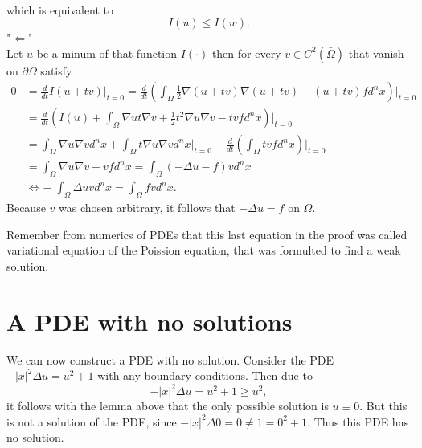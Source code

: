 \documentclass[A4,12pt,twoside]{book}
\begin{document}
{\begin{align*}
    \end{align*}
    which is equivalent to 
    \[
    I(u) \leq I(w).
    \]
    "$\Leftarrow$"\\
    Let $u$ be a minum of that function $I(\cdot)$ then for every $v \in C^2 (\bar{\Omega})$ that vanish on $\partial \Omega$ satisfy 
    \begin{align*}
        0 &= \frac{d}{dt} I(u+ tv) \big|_{t=0} = \frac{d}{dt} \left( \int_\Omega \frac{1}{2} \nabla (u+tv) \nabla (u+tv) - (u+tv) f d^n x \right) \big|_{t=0} \\
        &= \frac{d}{dt}\left(  I(u)+ \int_\Omega \nabla u t \nabla v + \frac{1}{2} t^2 \nabla u \nabla v - t v f d^n x \right) \big|_{t=0} \\
        &=  \int_\Omega \nabla u  \nabla v d^n x + \int_\Omega t \nabla u \nabla v d^n x \big|_{t=0} - \frac{d}{dt}\left( \int_\Omega t v f d^n x \right) \big|_{t=0} \\
        &=  \int_\Omega \nabla u  \nabla v  -  v f d^n x = \int_\Omega (-\Delta u - f) v d^n x \\
        & \iff - \; \int_\Omega \Delta u v d^n x = \int_\Omega f v d^n x.
    \end{align*}
Because $v$ was chosen arbitrary, it follows that $-\Delta u =f $ on $\Omega$.
}

Remember from numerics of PDEs that this last equation in the proof was called variational equation of the Poission equation, that was formulted to find a weak solution.


\section{A PDE with no solutions}
We can now construct a PDE with no solution. Consider the PDE $-|x|^2 \Delta u =u^2 +1$ with any boundary conditions. Then due to 
\[
-|x|^2 \Delta u =u^2 +1 \geq u^2,
\]
it follows with the lemma above that the only possible solution is $u \equiv 0$. But this is not a solution of the PDE, since $- |x|^2 \Delta 0 =0 \neq 1 =0^2 +1$. Thus this PDE has no solution.
\end{document}
